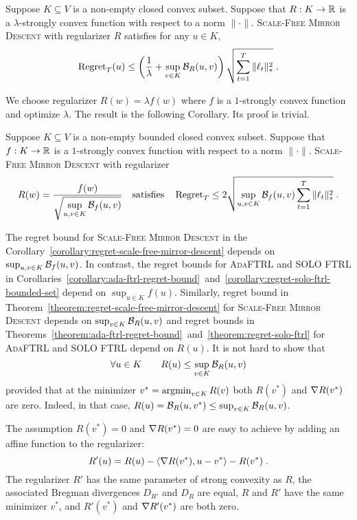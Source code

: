 \begin{theorem}
\label{theorem:regret-scale-free-mirror-descent}
Suppose $K \subseteq V$ is a non-empty closed convex subset. Suppose that $R:K
\to \mathbb{R}$ is a $\lambda$-strongly convex function with respect to a norm
$\|\cdot\|$.  \textsc{Scale-Free Mirror Descent} with regularizer $R$ satisfies
for any $u \in K$,
$$
\operatorname{Regret}_T(u) \le \left( \frac{1}{\lambda} + \sup_{v \in K} \mathcal{B}_R(u,v) \right) \sqrt{\sum_{t=1}^T \|\ell_t\|_*^2} \; .
$$
\end{theorem}

We choose regularizer $R(w) = \lambda f(w)$ where $f$ is a $1$-strongly convex
function and optimize $\lambda$. The result is the following Corollary. Its proof is trivial.

\begin{corollary}
\label{corollary:regret-scale-free-mirror-descent}
Suppose $K \subseteq V$ is a non-empty bounded closed convex subset.  Suppose
that $f:K \to \mathbb{R}$ is a $1$-strongly convex function with respect to a norm
$\|\cdot\|$.  \textsc{Scale-Free Mirror Descent} with regularizer
$$
R(w) = \frac{f(w)}{\displaystyle \sqrt{\sup_{u,v \in K} \Breg_f(u,v)}}
\quad \text{satisfies} \quad %
\Regret_T \le 2 \sqrt{\sup_{u,v \in K} \Breg_f(u,v) \sum_{t=1}^T \|\ell_t\|_*^2} \; .
$$
\end{corollary}

The regret bound for \textsc{Scale-Free Mirror Descent}
in the Corollary~\ref{corollary:regret-scale-free-mirror-descent}
depends on $\sup_{u,v \in K} \mathcal{B}_f(u,v)$. In contrast,
the regret bounds for \textsc{AdaFTRL} and \textsc{SOLO FTRL}
in Corollaries~\ref{corollary:ada-ftrl-regret-bound}~and~\ref{corollary:regret-solo-ftrl-bounded-set}
depend on $\sup_{u \in K} f(u)$.
Similarly, regret bound in Theorem~\ref{theorem:regret-scale-free-mirror-descent} for
\textsc{Scale-Free Mirror Descent} depends on $\sup_{v \in K} \mathcal{B}_R(u,v)$ and
regret bounds in Theorems~\ref{theorem:ada-ftrl-regret-bound}~and~\ref{theorem:regret-solo-ftrl}
for \textsc{AdaFTRL} and \textsc{SOLO FTRL} depend on $R(u)$. It is not hard to show that
$$
\forall u \in K \qquad R(u) \le \sup_{v \in K} \mathcal{B}_R(u,v)
$$
provided that at the minimizer $v^* = \operatorname*{argmin}_{v \in K} R(v)$ both $R(v^*)$ and
$\nabla R(v^*)$ are zero. Indeed, in that case, $R(u) = \mathcal{B}_R(u,v^*) \le
\sup_{v \in K} \mathcal{B}_R(u,v)$.

The assumption $R(v^*) = 0$ and $\nabla R(v^*) = 0$
are easy to achieve by adding an affine function to the regularizer:
$$
R'(u) = R(u) - \langle \nabla R(v^*), u - v^* \rangle - R(v^*) \; .
$$
The regularizer $R'$ has the same parameter of strong convexity as $R$, the
associated Bregman divergences $D_{R'}$ and $D_{R}$ are equal, $R$ and $R'$
have the same minimizer $v^*$, and $R'(v^*)$ and $\nabla R'(v^*)$ are both zero.

